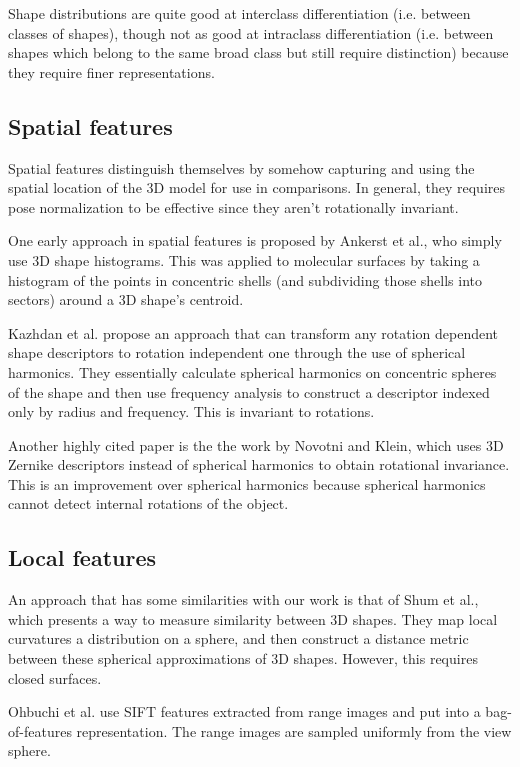 \documentclass[../tech_report_1.tex]{subfiles}
\begin{document}
Shape distributions are quite good at interclass differentiation (i.e. between classes of shapes), though not as good at intraclass differentiation\cite{tangelder2008survey} (i.e. between shapes which belong to the same broad class but still require distinction) because they require finer representations.

\subsection{Spatial features}

Spatial features distinguish themselves by somehow capturing and using the spatial location of the 3D model for use in comparisons. In general, they requires pose normalization to be effective since they aren't rotationally invariant.

One early approach in spatial features is proposed by Ankerst et al.\cite{ankerst19993d}, who simply use 3D shape histograms. This was applied to molecular surfaces by taking a histogram of the points in concentric shells (and subdividing those shells into sectors) around a 3D shape's centroid.

Kazhdan et al.\cite{kazhdan2003rotation} propose an approach that can transform any rotation dependent shape descriptors to rotation independent one through the use of spherical harmonics. They essentially calculate spherical harmonics on concentric spheres of the shape and then use frequency analysis to construct a descriptor indexed only by radius and frequency. This is invariant to rotations.

Another highly cited paper is the the work by Novotni and Klein\cite{novotni20033d}, which uses 3D Zernike descriptors instead of spherical harmonics to obtain rotational invariance. This is an improvement over spherical harmonics because spherical harmonics cannot detect internal rotations of the object.

\subsection{Local features}

An approach that has some similarities with our work is that of Shum et al., which presents a way to measure similarity between 3D shapes. They map local curvatures a distribution on a sphere, and then construct a distance metric between these spherical approximations of 3D shapes. However, this requires closed surfaces.

Ohbuchi et al.\cite{ohbuchi2008salient} use SIFT features extracted from range images and put into a bag-of-features representation. The range images are sampled uniformly from the view sphere.
\end{document}
